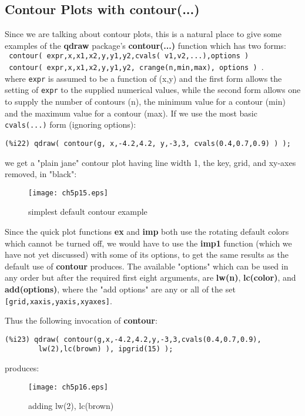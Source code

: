 \documentclass[12pt]{article}
\begin{document}
\subsection{Contour Plots with contour(...)}
Since we are talking about contour plots, this is a natural place to
give some examples of the \textbf{qdraw} package's \textbf{contour(...)} function
 which has two forms:\\
 \verb| contour( expr,x,x1,x2,y,y1,y2,cvals( v1,v2,...),options )| \\
 \verb| contour( expr,x,x1,x2,y,y1,y2, crange(n,min,max), options ) |.\\
where \verb|expr| is assumed to be a function of (x,y) and the first 
  form allows the setting of \verb|expr| to the supplied numerical values,
  while the second form allows one to supply the number of contours (n),
  the minimum value for a contour (min) and the maximum value for a
  contour (max).
If we use the most basic \verb|cvals(...)| form (ignoring options):
\small
\begin{verbatim}
(%i22) qdraw( contour(g, x,-4.2,4.2, y,-3,3, cvals(0.4,0.7,0.9) ) );
\end{verbatim}
\normalsize
we get a "plain jane" contour plot having line width 1, the key, grid, and xy-axes removed,
  in "black":
\begin{figure} [h]
   \centerline{\texttt{[image: ch5p15.eps]} }
	\caption{simplest default contour example }
\end{figure}      
Since the quick plot functions \textbf{ex} and \textbf{imp} both use the rotating default
  colors which cannot be turned off, we would have to use the \textbf{imp1} function (which we
  have not yet discussed) with some of its options, to get the same results as the default
  use of \textbf{contour} produces. 
 The available "options" which can be used in any order but after the  required
   first eight arguments, are \textbf{lw(n)}, \textbf{lc(color)}, and \textbf{add(options)},
   where the "add options" are any or all of the set \verb|[grid,xaxis,yaxis,xyaxes]|.

\smallskip
Thus the following invocation of \textbf{contour}:
\small
\begin{verbatim}
(%i23) qdraw( contour(g,x,-4.2,4.2,y,-3,3,cvals(0.4,0.7,0.9),
        lw(2),lc(brown) ), ipgrid(15) );
\end{verbatim}
\normalsize
produces:
\begin{figure} [h]
   \centerline{\texttt{[image: ch5p16.eps]} }
	\caption{adding lw(2), lc(brown) }
\end{figure}      
   
\end{document}
